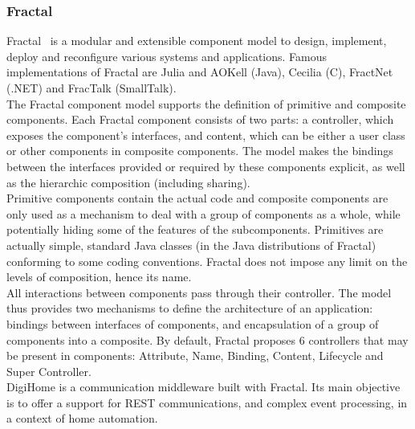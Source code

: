 \subsubsection{Fractal}

Fractal~\cite{Bruneton:2006} is a modular and extensible component model to design, implement, deploy and reconfigure various systems and applications. Famous implementations of Fractal are Julia and AOKell (Java), Cecilia (C), FractNet (.NET) and FracTalk (SmallTalk).\\
The Fractal component model supports the definition of primitive and composite components. Each Fractal component consists of two parts: a controller, which exposes the component's interfaces, and content, which can be either a user class or other components in composite components. The model makes the bindings between the interfaces provided or required by these components explicit, as well as the hierarchic composition (including sharing).\\
Primitive components contain the actual code and composite components are only used as a mechanism to deal with a group of components as a whole, while potentially hiding some of the features of the subcomponents. Primitives are actually simple, standard Java classes (in the Java distributions of Fractal) conforming to some coding conventions. Fractal does not impose any limit on the levels of composition, hence its name.\\
All interactions between components pass through their controller. The model thus provides two mechanisms to define the architecture of an application: bindings between interfaces of components, and encapsulation of a group of components into a composite. By default, Fractal proposes 6 controllers that may be present in components: Attribute, Name, Binding, Content, Lifecycle and Super Controller.\\
DigiHome\cite{Romero:2010} is a communication middleware built with Fractal. Its main objective is to offer a support for REST communications, and complex event processing, in a context of home automation.


